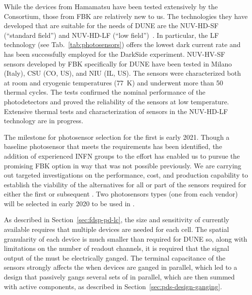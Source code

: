 
While the devices from Hamamatsu have been tested extensively by the Consortium, those from FBK are relatively new to us. The technologies they have developed that are suitable for the needs of DUNE are the NUV-HD-SF (``standard field'') and NUV-HD-LF (``low field'')~\cite{Gola:2019idb}. In particular, the LF technology (see Tab.~\ref{tab:photosensors}) offers the lowest dark current rate and has been successfully employed for the DarkSide experiment. NUV-HV-SF sensors developed by FBK specifically for DUNE have been tested in Milano (Italy), CSU (CO, US), and NIU (IL, US). The sensors were characterized both at room and cryogenic temperatures (\SI{77}{K}) and underwent more than \num{50} thermal cycles. The tests confirmed the nominal performance of the photodetectors and proved the reliability of the sensors at low temperature. Extensive thermal tests and characterization of sensors in the NUV-HD-LF technology are in progress.   


The milestone for photosensor selection for the first  is early 2021.  Though a baseline photosensor that meets the requirements has been identified, the addition of experienced INFN groups to the  effort has enabled us to pursue the promising FBK option in way that was not possible previously.  We are carrying out targeted investigations on the performance, cost, and production capability to establish the viability of the alternatives for all or part of the sensors required for either the first or subsequent . Two photosensors types (one from each vendor) will be selected in early 2020 to be used in .


As described in Section~\ref{sec:fdsp-pd-lc}, the size and sensitivity of currently available  requires that multiple devices are needed for each  cell. The spatial granularity of each device is much smaller than required for DUNE so,
along with limitations on the number of readout channels, it is required that the signal output of the  must be electrically ganged. The terminal capacitance of the sensors strongly affects the  when devices are ganged in parallel, which led to a design that passively gangs several sets of  in parallel, which are then summed with active components, as described in Section~\ref{sec:pds-design-ganging}.



